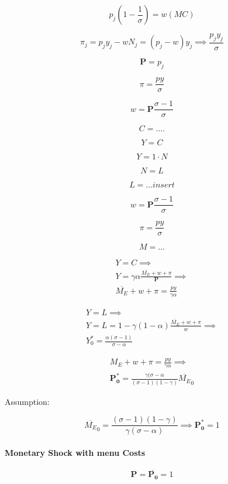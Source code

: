 $$
p_j \left(1 - \frac{1}{\sigma}  \right)  = w (MC)
$$

$$
\pi_j = p_j y_j - wN_j = \left( p_j - w  \right)y_j \implies \frac{p_j y_j}{\sigma}
$$

$$
\mathbf{P} = p_j
$$

$$
\pi = \frac{p y}{\sigma}
$$

$$
w = \mathbf{P} \frac{\sigma - 1}{\sigma}
$$

$$
C = ....
$$

$$
Y = C
$$

$$
Y = 1 \cdot N
$$

$$
N = L
$$

$$
L = ... insert
$$

$$
w = \mathbf{P} \frac{\sigma - 1}{\sigma}
$$

$$
\pi = \frac{p y}{\sigma}
$$

$$
M = ...
$$


\begin{align}
    Y = C \implies \\
    Y = \gamma \alpha \frac { \overline { M _ { E } } + w + \pi } { \mathbf { P } } \implies \\
    \overline{M_E} + w + \pi = \frac{p y}{\gamma \alpha}
\end{align}

\begin{align}
    Y = L \implies \\
    Y = L = 1 - \gamma \left( 1 - \alpha  \right) \frac{\overline{M_E} + w + \pi}{w} \implies \\
    Y_0^* = \frac{\alpha ( \sigma - 1 )}{\sigma - \alpha}
\end{align}


\begin{align}
    M_E + w + \pi = \frac{p y}{\gamma \alpha} \implies \\
    \mathbf{P_0^*} = \frac{\gamma (\sigma - \alpha}{(\sigma - 1)(1 - \gamma)}\overline{M_E}_0
\end{align}


Assumption:

$$
\overline{M_E}_0 = \frac{(\sigma - 1)(1 - \gamma)}{\gamma (\sigma - \alpha)} \implies \mathbf{P_0^*} = 1
$$

\paragraph{Monetary Shock with menu Costs}

$$
\mathbf{P} = \overline{\mathbf{P_0}} = 1
$$

